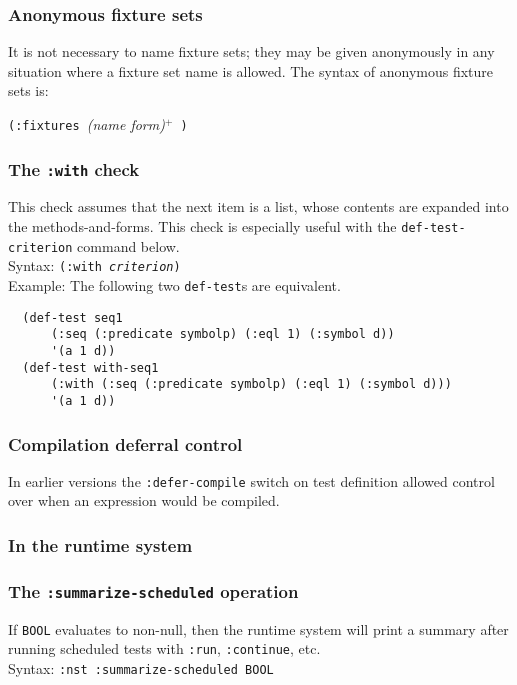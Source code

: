 \subsubsection{Anonymous fixture sets}
It is not necessary to name fixture sets; they may be given
anonymously in any situation where a fixture set name is allowed.  The
syntax of anonymous fixture sets
is:
\begin{center}
\texttt{(:fixtures }\textit{(name form)}$^+$\texttt{ )}
\end{center}

\subsubsection{The \texttt{:with} check}
This check assumes that the next item is a list, whose contents are
expanded into the methods-and-forms. This
check is especially useful with the \texttt{def-test-cri\-ter\-ion}
command below.
\\ Syntax: \texttt{(:with \emph{criterion})}
\\ Example: The following two \texttt{def-test}s are equivalent.
\begin{verbatim}
  (def-test seq1
      (:seq (:predicate symbolp) (:eql 1) (:symbol d))
      '(a 1 d))
  (def-test with-seq1
      (:with (:seq (:predicate symbolp) (:eql 1) (:symbol d)))
      '(a 1 d))
\end{verbatim}

\subsubsection{Compilation deferral control}
In earlier versions the \texttt{:defer-compile} switch on test
definition allowed control over when an expression would be compiled.

\subsubsection{In the runtime system}

\subsubsection{The \texttt{:summarize-scheduled} operation}
%
If \texttt{BOOL} evaluates to non-null, then the runtime system will
print a summary after running scheduled tests with \texttt{:run},
\texttt{:continue}, etc.
\\ Syntax: \texttt{:nst :summarize-scheduled BOOL}

